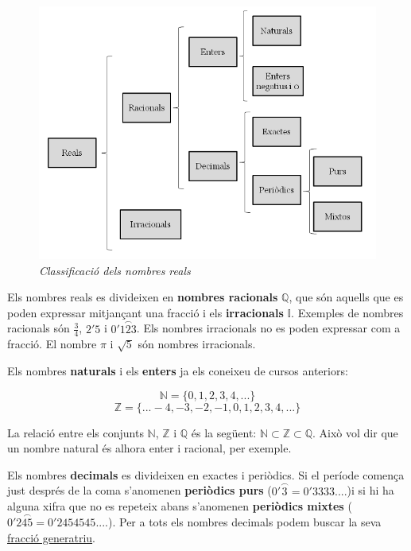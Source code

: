 \documentclass[]{article}
\begin{document}
\begin{figure}[htbp]
\centering
\includegraphics{img/classificacio_reals_1.png}
\caption{\emph{Classificació dels nombres reals}}
\end{figure}

Els nombres reals es divideixen en \textbf{nombres racionals}
\textbf{\(\mathbb{Q}\)}, que són aquells que es poden expressar
mitjançant una fracció i els \textbf{irracionals}
\textbf{\(\mathbb{I}\)}. Exemples de nombres racionals són
\(\frac{3}{4}\), \(2'5\) i \(0'\stackrel\frown{123}\). Els nombres
irracionals no es poden expressar com a fracció. El nombre \(\pi\) i
\(\sqrt{5}\) són nombres irracionals.

Els nombres \textbf{naturals} i els \textbf{enters} ja els coneixeu de
cursos anteriors:

\[\mathbb{N}=\{0, 1, 2, 3, 4,...\}\]
\[\mathbb{Z}=\{...-4, -3, -2, -1, 0, 1, 2, 3, 4,...\}\]

La relació entre els conjunts \(\mathbb{N}\), \(\mathbb{Z}\) i
\(\mathbb{Q}\) és la següent:
\(\mathbb{N} \subset \mathbb{Z} \subset \mathbb{Q}\). Això vol dir que
un nombre natural és alhora enter i racional, per exemple.

Els nombres \textbf{decimals} es divideixen en exactes i periòdics. Si
el període comença just després de la coma s'anomenen \textbf{periòdics
purs} (\(0'\stackrel\frown{3}=0'3333....\))i si hi ha alguna xifra que
no es repeteix abans s'anomenen \textbf{periòdics mixtes}
(\(0'2\stackrel\frown{45}=0'2454545....\)). Per a tots els nombres
decimals podem buscar la seva
\href{http://www.edu365.cat/eso/muds/matematiques/edad/eso4B/reales/q1_contenidos1b.htm}{fracció
generatriu}.
\end{document}
